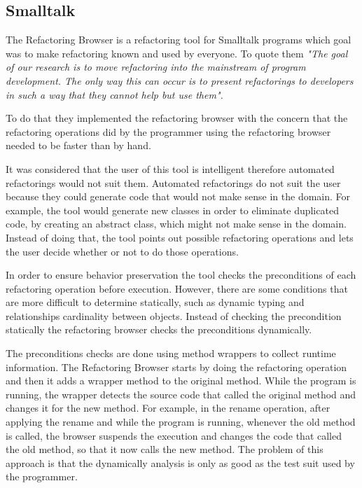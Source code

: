 





\subsection{Smalltalk}%

The Refactoring Browser \cite{roberts1997refactoring} is a refactoring tool for Smalltalk programs which goal was to make refactoring known and used by everyone.
To quote them  \textit{"The goal of our research is to move refactoring into the mainstream of program development. The only way this can occur is to present refactorings to developers in such a way that they cannot help but use them".} 

To do that they implemented the refactoring browser with the concern that the refactoring operations did by the programmer using the refactoring browser needed to be faster than by hand.

It was considered that the user of this tool is intelligent therefore automated refactorings would not suit them. 
Automated refactorings do not suit the user because they could generate code that would not make sense in the domain.
For example, the tool would generate new classes in order to eliminate duplicated code, by creating an abstract class, which might not make sense in the domain. Instead of doing that, the tool points out possible refactoring operations and lets the user decide whether or not to do those operations.

In order to ensure behavior preservation the tool checks the preconditions of each refactoring operation before execution. 
However, there are some conditions that are more difficult to determine statically, such as dynamic typing and relationships cardinality between objects. 
Instead of checking the precondition statically the refactoring browser checks the preconditions dynamically. 

The preconditions checks are done using method wrappers to collect runtime information. 
The Refactoring Browser starts by doing the refactoring operation and then it adds a wrapper method to the original method. 
While the program is running, the wrapper detects the source code that called the original method and changes it for the new method.
For example, in the rename operation, after applying the rename and while the program is running, whenever the old method is called, the browser suspends the execution and changes the code that called the old method, so that it now calls the new method. 
The problem of this approach is that the dynamically analysis is only as good as the test suit used by the programmer.


